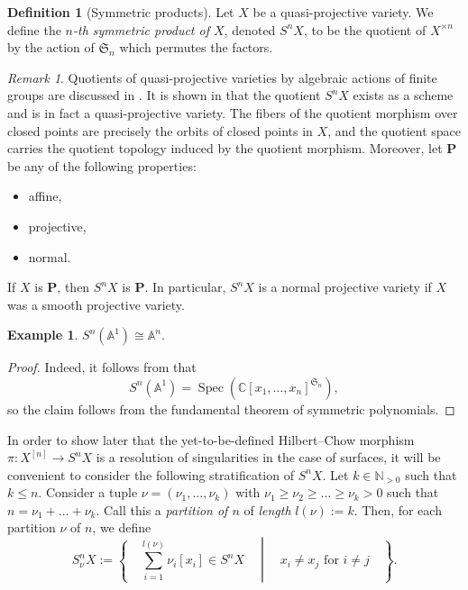 \documentclass[12pt,a4paper]{amsart}
\theoremstyle{plain}
\theoremstyle{definition}
\newtheorem{defn}[thm]{Definition}
\newtheorem{exmp}[thm]{Example}
\theoremstyle{remark}
\newtheorem{rem}[thm]{Remark}
\begin{document}
\begin{defn}[Symmetric products]
  Let $X$ be a quasi-projective variety.
  We define the \textit{$n$-th symmetric product of $X$}, denoted $S^{n}X$, to be the quotient of $X^{\times n}$ by the action of $\mathfrak{S}_{n}$ which permutes the factors.
\end{defn}

\begin{rem}
  Quotients of quasi-projective varieties by algebraic actions of finite groups are discussed in .
  It is shown in  that the quotient $S^{n}X$ exists as a scheme and is in fact a quasi-projective variety.
  The fibers of the quotient morphism over closed points are precisely the orbits of closed points in $X$, and the quotient space carries the quotient topology induced by the quotient morphism.
  Moreover, let $\mathbf{P}$ be any of the following properties:
  \begin{itemize}
    \item affine,
    \item projective,
    \item normal.
  \end{itemize}
  If $X$ is $\mathbf{P}$, then $S^{n}X$ is $\mathbf{P}$.
  In particular, $S^{n}X$ is a normal projective variety if $X$ was a smooth projective variety.
\end{rem}

\begin{exmp}\label{exmp:affineline}
  $S^{n}(\mathbb{A}^{1}) \cong \mathbb{A}^{n}$.
  
  \begin{proof}
    Indeed, it follows from  that
    \[ S^{n}(\mathbb{A}^{1}) = \operatorname{Spec}\left(\mathbb{C}[x_{1}, \ldots, x_{n}]^{\mathfrak{S}_{n}}\right), \]
    so the claim follows from the fundamental theorem of symmetric polynomials.
  \end{proof}
\end{exmp}

In order to show later that the yet-to-be-defined Hilbert--Chow morphism $\pi \colon X^{[n]} \to S^{n}X$ is a resolution of singularities in the case of surfaces, it will be convenient to consider the following stratification of $S^{n}X$.
Let $k \in \mathbb{N}_{>0}$ such that $k \leq n$.
Consider a tuple $\nu = (\nu_{1}, \ldots, \nu_{k})$ with $\nu_{1} \geq \nu_{2} \geq \ldots \geq \nu_{k} > 0$ such that $n = \nu_{1} + \ldots + \nu_{k}$.
Call this a \textit{partition of $n$} of \textit{length} $l(\nu) := k$.
Then, for each partition $\nu$ of $n$, we define
\[ S^{n}_{\nu}X := \left\{ \quad \sum_{i = 1}^{l(\nu)} \nu_{i}[x_{i}] \in S^{n}X \quad \middle| \quad x_{i} \neq x_{j} \text{ for } i \neq j \quad \right\}. \]
\end{document}
